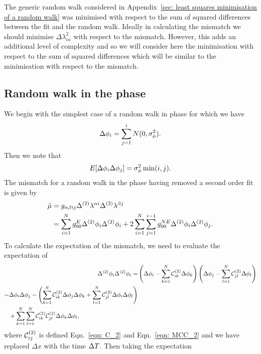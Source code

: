 The generic random walk considered in Appendix~\ref{sec: least squares
minimisation of a random walk} was minimised with respect to the sum of squared
differences between the fit and the random walk. Ideally in calculating the
mismatch we should minimise $\Delta\lambda_{\alpha i}^{2}$ with respect to the
mismatch. However, this adds an additional level of complexity and so we will
consider here the minimisation with respect to the sum of squared differences
which will be similar to the minimisation with respect to the mismatch.

\subsection{Random walk in the phase}
We begin with the simplest case of a random walk in phase for which we have
\begin{equation}
\Delta\phi_{i} = \sum_{j=1}^{i}N(0, \sigma_{\phi}^{2}).
\end{equation}
Then we note that
\begin{equation}
E[\Delta\phi_{i} \Delta\phi_{j}] = \sigma_{\phi}^{2} \min(i, j).
\end{equation}
The mismatch for a random walk in the phase having removed a second order
fit is given by
\begin{align}
\tilde{\mu} & = g_{\alpha \beta i j} \Delta^{(2)}\lambda^{\alpha i}\Delta^{(2)}\lambda^{\beta j} \\
& = \sum_{i=1}^{N}g_{00}^{E} \Delta^{(2)}\phi_{i}\Delta^{(2)}\phi_{i}
+ 2 \sum_{i=1}^{N}\sum_{j=1}^{i-1}g_{00}^{NE}\Delta^{(2)}\phi_{i}\Delta^{(2)}\phi_{j}.
\label{eqn: 4202540871}
\end{align}
To calculate the expectation of the mismatch, we need to evaluate the
expectation of
\begin{align}
\Delta^{(2)}\phi_{i}\Delta^{(2)}\phi_{i} = & \left(\Delta\phi_{i}
- \sum_{k=1}^{N}\mathcal{C}^{(2)}_{ik}\Delta\phi_{k}\right)
 \left(\Delta\phi_{j} - \sum_{l=1}^{N}\mathcal{C}^{(2)}_{jl}\Delta\phi_{l}\right) \\
\begin{split}
= & \Delta\phi_{i}\Delta\phi_{j} -
\left(\sum_{k=1}^{N}\mathcal{C}^{(2)}_{ik} \Delta\phi_{j}\Delta\phi_{k}
+ \sum_{l=1}^{N}\mathcal{C}^{(2)}_{jl}\Delta\phi_{i}\Delta\phi_{l}\right) \\
& +
\sum_{k=1}^{N}\sum_{l=1}^{N}\mathcal{C}^{(2)}_{ik}\mathcal{C}^{(2)}_{jl} \Delta\phi_{k}\Delta\phi_{l},
\end{split}
\end{align}
where $\mathcal{C}^{(2)}_{ij}$ is defined Eqn.~\ref{eqn: C_2} and Eqn.~\ref{eqn:  MCC_2}
and we have replaced $\Delta x$ with the time $\Delta T$. Then taking the expectation
